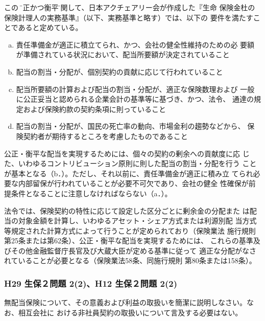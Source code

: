 \documentclass[report,gutter=10mm,fore-edge=10mm,uplatex,dvipdfmx]{jlreq}
\begin{document}
この \"公正かつ衡平\"
に関して、日本アクチェアリー会が作成した『生命
保険金杜の保険計理人の実務基準』（以下、実務基準と略す）では、以下の
要件を満たすことであると定めている。

\begin{enumerate} [a.]
 \item 責任準備金が適正に積立てられ、かつ、会社の健全性維持のための必
 要額が準備されている状況において、配当所要額が決定されていること
 \item 
 配当の割当・分配が、個別契約の貢献に応じて行われていること
 \item  配当所要額の計算および配当の割当・分配が、適正な保険数理および
 一般に公正妥当と認められる企業会計の基準等に基づき、かつ、法令、
 通達の規定および保険約款の契約条項に則っていること
 \item  配当の割当・分配が、国民の死亡率の動向、市場金利の趨勢などから、
 保険契約者が期待するところを考慮したものであること
\end{enumerate}

公正・衡平な配当を実現するためには、個々の契約の剰余への貢献度に応
じた、いわゆるコントリビューション原則に則した配当の割当・分配を行う
ことが基本となる（b．）。ただし、それ以前に、責任準備金が適正に積み立
てられ必要な内部留保が行われていることが必要不可欠であり、会社の健全
性確保が前提条件となることに注意しなければならない（a．）。

法令では、保険契約の特性に応じて設定した区分ごとに剰余金の分配また
は配当の対象金額を計算し、いわゆるアセット・シェア方式または利源別配
当方式等規定された計算方式によって行うことが定められており（保険業法
施行規則第25条または第62条）、公正・衡平な配当を実現するためには、
これらの基準及びその他金融監督庁長官及び大蔵大臣が定める基準に従って
適正な分配がなされていることが必要となる（保険業法58条、同施行規則
第80条または158条）。

\subsubsection{H29 生保２問題 2(2)、H12 生保２問題 2(2)}
無配当保険について、その意義および利益の取扱いを簡潔に説明しなさい。なお、相互会社に
おける非社員契約の取扱いについて言及する必要はない。
\end{document}
